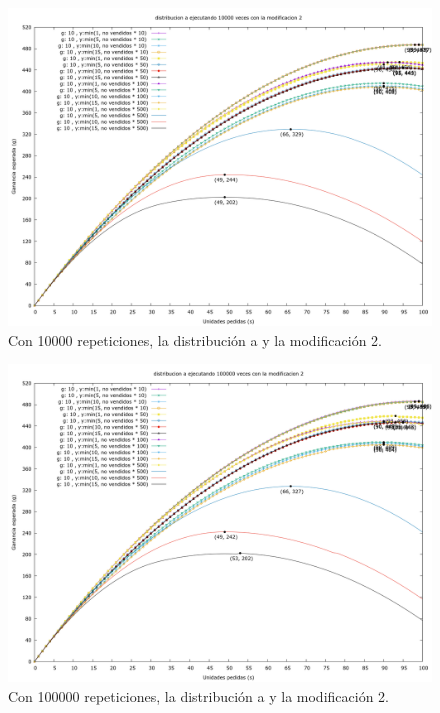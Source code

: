 \documentclass[12pt, spanish]{article}
\begin{document}
\begin{figure}[H]
	\centering
	\includegraphics[scale = 0.2]{prob_a/datos_a_10000_2.png}
	\caption{Con 10000 repeticiones, la distribución a y la modificación 2.}
	\label{fig:ej1_a_10000}

\end{figure}

\begin{figure}[H]
	\centering
	\includegraphics[scale = 0.2]{prob_a/datos_a_100000_2.png}
	\caption{Con 100000 repeticiones, la distribución a y la modificación 2.}
	\label{fig:ej1_a_100000}

\end{figure}
\end{document}
